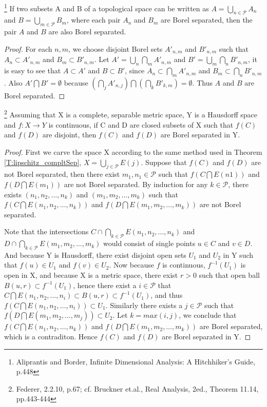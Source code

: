 \begin{lemma}
\footnote{Aliprantis and Border, Infinite Dimensional Analysis: A 
  Hitchhiker's Guide, p.448}
If two subsets A and B of a topological space can be written as 
$A=\bigcup_{n\in\mathcal{P}} A_n$ and 
$B=\bigcup_{m\in\mathcal{P}} B_m$, where each pair $A_n$ and $B_m$ are Borel
separated, then the pair $A$ and $B$ are also Borel separated.
\end{lemma}
\begin{proof}
For each $n,m$, we choose disjoint Borel sets $A'_{n,m}$ and $B'_{n,m}$ such
that $A_n\subset A'_{n,m}$ and $B_m\subset B'_{n,m}$. Let
$A'=\bigcup_n \bigcap_m A'_{n,m}$ and $B'=\bigcup_m \bigcap_n B'_{n,m}$,
it is easy to see that $A\subset A'$ and $B\subset B'$, since 
$A_n\subset\bigcap_m A'_{n,m}$ and $B_m\subset\bigcap_n B'_{n,m}$.
Also $A'\bigcap B'=\emptyset$ because 
$(\bigcap_j A'_{n,j})\bigcap(\bigcap_k B'_{k,m})=\emptyset$.
Thus $A$ and $B$ are Borel separated.
\end{proof}


\begin{lemma} \label{L:sep_lusin}
\footnote{Federer, 2.2.10, p.67;
  cf. Bruckner et.al., Real Analysis, 2ed., Theorem 11.14, pp.443-444}
Assuming that X is a complete, separable metric space, Y is a Hausdorff space
and $f:X\to Y$ is continuous, if C and D are closed subsets of X such that 
$f(C)$ and $f(D)$ are disjoint, then $f(C)$ and $f(D)$ are Borel separated in Y. 
\end{lemma}
\begin{proof}
First we carve the space X according to the same method used in 
Theorem \ref{T:lipschitz_compltSep}, $X=\bigcup_{j\in\mathcal{P}} E(j)$.
Suppose that $f(C)$ and $f(D)$ are not Borel separated, then there exist
$m_1,n_1\in \mathcal{P}$ such that $f(C\bigcap E(n1))$ and $f(D\bigcap E(m_1))$
are not Borel separated. By induction for any $k\in\mathcal{P}$, there exists
$(n_1,n_2,\dots,n_k)$ and $(m_1,m_2,\dots,m_k)$ such that 
$f(C\bigcap E(n_1,n_2,\dots,n_k))$ and $f(D\bigcap E(m_1,m_2,\dots,m_k))$
are not Borel separated. 

Note that the intersections 
$C\cap \bigcap_{k\in\mathcal{P}} E(n_1,n_2,\dots,n_k)$ and
$D\cap \bigcap_{k\in\mathcal{P}} E(m_1,m_2,\dots,m_k)$ would consist of single
points $u\in C$ and $v\in D$. And because Y is Hausdorff, there exist disjoint
open sets $U_1$ and $U_2$ in Y such that $f(u)\in U_1$ and $f(v)\in U_2$.
Now because $f$ is continuous, $f^{-1}(U_1)$ is open in X, and because X is a
metric space, there exist $r>0$ such that open ball $B(u,r)\subset f^{-1}(U_1)$,
hence there exist a $i\in\mathcal{P}$ that 
$C\bigcap E(n_1,n_2,\dots,n_i)\subset B(u,r)\subset f^{-1}(U_1)$, and thus
$f(C\bigcap E(n_1,n_2,\dots,n_i))\subset U_1$. Similarly there exists a 
$j\in \mathcal{P}$ such that
$f(D\bigcap E(m_1,m_2,\dots,m_j))\subset U_2$. Let $k=max(i,j)$, we conclude
that $f(C\bigcap E(n_1,n_2,\dots,n_k))$ and $f(D\bigcap E(m_1,m_2,\dots,m_k))$
are Borel separated, which is a contraditon. Hence $f(C)$ and $f(D)$ are Borel 
separated in Y. 
\end{proof}

